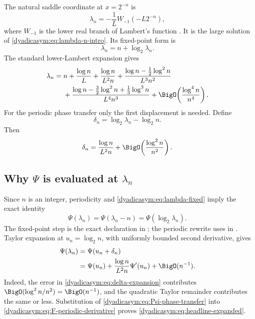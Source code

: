 \documentclass[11pt,oneside]{article}
\theoremstyle{definition}
\theoremstyle{remark}
\begin{document}
The natural saddle coordinate at $x=2^{-n}$ is
\begin{equation}
 \lambda_n=-\frac1L W_{-1}(-L2^{-n}),                       \label{dyadicasym:eq:lambda-W}
\end{equation}
where $W_{-1}$ is the lower real branch of Lambert's function
\cite{dyadicasym:corless1996}.  It is the large solution of \eqref{dyadicasym:eq:lambda-n-intro}.  Its fixed-point
form is
\begin{equation}
 \lambda_n=n+\log_2\lambda_n.                               \label{dyadicasym:eq:lambda-fixed}
\end{equation}
The standard lower-Lambert expansion gives
\begin{align}
 \lambda_n={}&n+\frac{\log n}{L}+\frac{\log n}{L^2n}
 +\frac{\log n-\tfrac12\log^2n}{L^3n^2}                    \notag\\
 &+\frac{\log n-\tfrac32\log^2n+\tfrac13\log^3n}{L^4n^3}
 +\BigO\!\left(\frac{\log^4n}{n^4}\right).               \label{dyadicasym:eq:lambda-expansion}
\end{align}
For the periodic phase transfer only the first displacement is needed.  Define
\begin{equation}
 \delta_n=\log_2\lambda_n-\log_2n.                          \label{dyadicasym:eq:delta}
\end{equation}
Then
\begin{equation}
 \delta_n=\frac{\log n}{L^2n}
 +\BigO\!\left(\frac{\log^2n}{n^2}\right).                \label{dyadicasym:eq:delta-expansion}
\end{equation}

\subsection{Why \texorpdfstring{$\Psi$}{Psi} is evaluated at \texorpdfstring{$\lambda_n$}{lambda n}}

Since $n$ is an integer, periodicity and \eqref{dyadicasym:eq:lambda-fixed} imply the exact identity
\begin{equation}
 \Psi(\lambda_n)=\Psi(\lambda_n-n)
 =\Psi(\log_2\lambda_n).                                   \label{dyadicasym:eq:Psi-lambda-exact}
\end{equation}
The fixed-point step is the exact declaration
 in ; the periodic rewrite
uses  in .
Taylor expansion at $u_n=\log_2n$, with uniformly bounded second derivative, gives
\begin{align}
 \Psi(\lambda_n)
 &=\Psi(u_n+\delta_n)                                      \notag\\
 &=\Psi(u_n)+\frac{\log n}{L^2n}\Psi'(u_n)
   +\BigO(n^{-1}).                                          \label{dyadicasym:eq:Psi-phase-transfer}
\end{align}
Indeed, the error in \eqref{dyadicasym:eq:delta-expansion} contributes
$\BigO(\log^2n/n^2)=\BigO(n^{-1})$, and the quadratic Taylor remainder contributes the same
or less.  Substitution of \eqref{dyadicasym:eq:Psi-phase-transfer} into
\eqref{dyadicasym:eq:F-periodic-derivative} proves \eqref{dyadicasym:eq:headline-expanded}.
\end{document}
